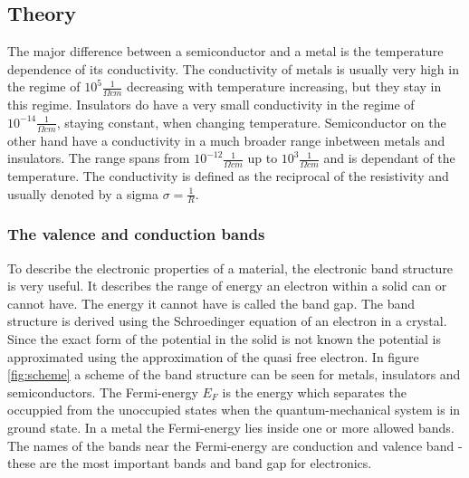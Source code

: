 \documentclass[a4paper]{article}
\begin{document}
\subsection{Theory}
\label{sec:theory}

The major difference between a semiconductor and a metal is the temperature dependence of its conductivity. The conductivity of metals is usually very high in the regime of $10^5 \frac{1}{\Omega cm}$ decreasing with temperature increasing, but they stay in this regime. Insulators do have a very small conductivity in the regime of $10^{-14} \frac{1}{\Omega cm}$, staying constant, when changing temperature. Semiconductor on the other hand have a conductivity in a much broader range inbetween metals and insulators. The range spans from $10^{-12} \frac{1}{\Omega cm}$ up to $10^3 \frac{1}{\Omega cm}$ and is dependant of the temperature. The conductivity is defined as the reciprocal of the resistivity and usually denoted by a sigma $\sigma = \frac{1}{R}$.

\subsubsection{The valence and conduction bands}

To describe the electronic properties of a material, the electronic band structure is very useful. It describes the range of energy an electron within a solid can or cannot have. The energy it cannot have is called the band gap. The band structure is derived using the Schroedinger equation of an electron in a crystal. Since the exact form of the potential in the solid is not known the potential is approximated using the approximation of the quasi free electron. In figure \ref{fig:scheme} a scheme of the band structure can be seen for metals, insulators and semiconductors. The Fermi-energy $E_F$ is the energy which separates the occuppied from the unoccupied states when the quantum-mechanical system is in ground state. In a metal the Fermi-energy lies inside one or more allowed bands. The names of the bands near the Fermi-energy are conduction and valence band - these are the most important bands and band gap for electronics.
\end{document}
